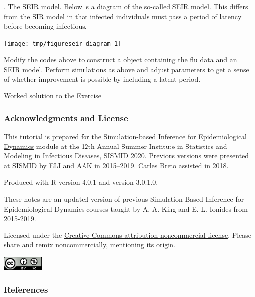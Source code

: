 \documentclass{beamer}\usepackage[]{graphicx}\usepackage[]{color}
\newenvironment{knitrout}{}{} %
\begin{document}
\begin{frame}[fragile] 

\myquestion. The SEIR model. Below is a diagram of the so-called SEIR model.
This differs from the SIR model in that infected individuals must pass a period of latency before becoming infectious.

\begin{knitrout}\small
{}\color{fgcolor}

{\centering \texttt{[image: tmp/figureseir-diagram-1]} 

}



\end{knitrout}

Modify the codes above to construct a  object containing the flu data and an SEIR model.
Perform simulations as above and adjust parameters to get a sense of whether improvement is possible by including a latent period.

\href{./exercises.html#basic-exercise-the-seir-model}{Worked solution to the Exercise}

\end{frame} 

\begin{frame}[fragile]
\frametitle{Acknowledgments and License}

\bi
\item This tutorial is prepared for the \href{https://kingaa.github.io/sbied/}{Simulation-based Inference for Epidemiological Dynamics} module at the 12th Annual Summer Institute in Statistics and Modeling in Infectious Diseases, \href{https://www.biostat.washington.edu/suminst/sismid}{SISMID 2020}. 
Previous versions were presented at SISMID by ELI and AAK in 2015--2019.
Carles Breto assisted in 2018.

\item Produced with R version 4.0.1 and  version 3.0.1.0.

\item These notes are an updated version of previous Simulation-Based Inference for Epidemiological Dynamics courses taught by A. A. King and E. L. Ionides from 2015-2019.

\item
Licensed under the \href{http://creativecommons.org/licenses/by-nc/3.0/}{Creative Commons attribution-noncommercial license}.
Please share and remix noncommercially, mentioning its origin.

\includegraphics[width=2cm]{../graphics/cc-by-nc.png}
\ei

\end{frame}


\begin{frame}[allowframebreaks]
\frametitle{References}

\end{frame}
\end{document}
